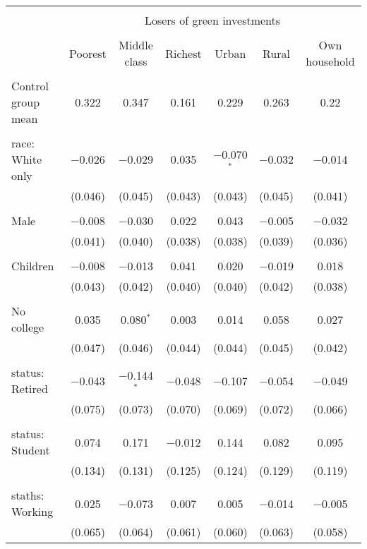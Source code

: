 
\begin{tabular}{@{\extracolsep{5pt}}lcccccc} 
\\[-1.8ex]\hline 
\hline \\[-1.8ex] 
 & \multicolumn{6}{c}{Losers of green investments} \\ 
\cline{2-7} 
\\[-1.8ex] & Poorest & Middle class & Richest & Urban & Rural & Own household \\ 
\hline \\[-1.8ex] 
 Control group mean & 0.322 & 0.347 & 0.161 & 0.229 & 0.263 & 0.22  \\ \hline \\[-1.8ex] race: White only & $-$0.026 & $-$0.029 & 0.035 & $-$0.070$^{*}$ & $-$0.032 & $-$0.014 \\ 
  & (0.046) & (0.045) & (0.043) & (0.043) & (0.045) & (0.041) \\ 
  & & & & & & \\ 
 Male & $-$0.008 & $-$0.030 & 0.022 & 0.043 & $-$0.005 & $-$0.032 \\ 
  & (0.041) & (0.040) & (0.038) & (0.038) & (0.039) & (0.036) \\ 
  & & & & & & \\ 
 Children & $-$0.008 & $-$0.013 & 0.041 & 0.020 & $-$0.019 & 0.018 \\ 
  & (0.043) & (0.042) & (0.040) & (0.040) & (0.042) & (0.038) \\ 
  & & & & & & \\ 
 No college & 0.035 & 0.080$^{*}$ & 0.003 & 0.014 & 0.058 & 0.027 \\ 
  & (0.047) & (0.046) & (0.044) & (0.044) & (0.045) & (0.042) \\ 
  & & & & & & \\ 
 status: Retired & $-$0.043 & $-$0.144$^{*}$ & $-$0.048 & $-$0.107 & $-$0.054 & $-$0.049 \\ 
  & (0.075) & (0.073) & (0.070) & (0.069) & (0.072) & (0.066) \\ 
  & & & & & & \\ 
 status: Student & 0.074 & 0.171 & $-$0.012 & 0.144 & 0.082 & 0.095 \\ 
  & (0.134) & (0.131) & (0.125) & (0.124) & (0.129) & (0.119) \\ 
  & & & & & & \\ 
 staths: Working & 0.025 & $-$0.073 & 0.007 & 0.005 & $-$0.014 & $-$0.005 \\ 
  & (0.065) & (0.064) & (0.061) & (0.060) & (0.063) & (0.058) \\ 

\end{tabular}

